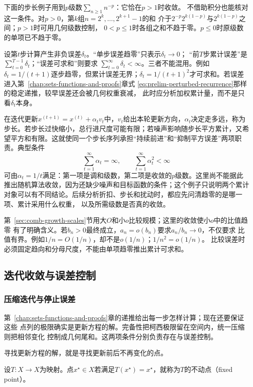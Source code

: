 下面的步长例子用到$p$级数$\sum_{n\geq1}n^{-p}$：它恰在$p>1$时收敛。
不借助积分也能核对这一条件。对$p>0$，第$k$组$n=2^k,\ldots,2^{k+1}-1$的和
介于$2^{-p}2^{k(1-p)}$与$2^{k(1-p)}$之间；$p>1$时可用几何级数控制，
$0<p\leq1$时各组之和不趋于零。$p\leq0$时原级数的单项已不趋于零。

设第$t$步计算产生非负误差$\delta_t$。“单步误差趋零”只表示$\delta_t\to0$； “前$T$步累计误差”是$\sum_{t=0}^{T-1}\delta_t$；“误差可求和”则要求 $\sum_{t=0}^{\infty}\delta_t<\infty$。三者不能混用。例如 $\delta_t=1/(t+1)$逐步趋零，但累计误差无界；$\delta_t=1/(t+1)^2$才可求和。若误差进入第~\ref{chap:sets-functions-and-proofs}章式
\eqref{eq:prelim-perturbed-recurrence}那样的稳定递推，较早误差还会被几何权重衰减， 此时应分析加权累计量，而不是只看$\delta_t$本身。

在迭代更新$x^{(t+1)}=x^{(t)}+\alpha_t v_t$中，$v_t$给出本轮更新方向，$\alpha_t$决定走多远，称为步长。若步长过快缩小，总行进尺度可能有限；若噪声影响随步长平方累计，又希望平方和有限。这就使同一个步长序列承担“持续前进”和“抑制平方误差”两项职责。典型条件
\[   \sum_{t=1}^{\infty}\alpha_t=\infty,   \qquad   \sum_{t=1}^{\infty}\alpha_t^2<\infty \]
可由$\alpha_t=1/t$满足：第一项是调和级数，第二项是收敛的$p$级数。这里尚不能据此推出随机算法收敛，因为还缺少噪声和目标函数的条件；这个例子只说明两个累计对象可以有不同结论。后续分析折扣、步长和扰动时，都应先问清趋零的是哪一项、累计采用什么权重， 以及所需级数是否真的收敛。


第~\ref{sec:comb-growth-scales}节用大$O$和小$o$比较规模；这里的收敛使小$o$中的比值趋零
有了明确含义。若$b_n>0$最终成立，$a_n=o(b_n)$要求$a_n/b_n\to0$，不仅要求
比值有界。例如$1/n=O(1/n)$，却不是$o(1/n)$；$1/n^2=o(1/n)$。
比较误差时必须固定趋向和分母尺度，不能由单项趋零推出累计可求和。

\subsection{迭代收敛与误差控制}
\subsubsection{压缩迭代与停止误差}
\label{sec:analysis-complete-contraction}

第~\ref{chap:sets-functions-and-proofs}章的递推给出每一步怎样计算；现在还要保证这些
点列的极限确实是更新方程的解。完备性把柯西极限留在空间内，统一压缩则把相邻变化
控制成几何尾和。这两项条件分别负责存在与误差控制。


寻找更新方程的解，就是寻找更新前后不再变化的点。
\begin{definition}[不动点]
\label{def:analysis-fixed-point}
设$T:X\to X$为映射。点$x^\star\in X$若满足$T(x^\star)=x^\star$，就称为$T$的不动点（fixed point）。
\end{definition}

